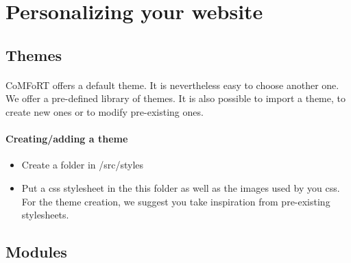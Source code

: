\documentclass{article}
\begin{document}
\section{Personalizing your website}
\subsection{Themes}

    \paragraph{}
    CoMFoRT offers a default theme. It is nevertheless easy to choose another one. We offer a pre-defined library of themes. It is also possible to import a theme, to create new ones or to modify pre-existing ones.
\paragraph{Creating/adding a theme}
      \begin{itemize}
      \item Create a folder in /src/styles
\item Put a css stylesheet in the this folder as well as the images used by you css. For the theme creation, we suggest you take inspiration from pre-existing stylesheets.
   \end{itemize}

  \subsection{Modules}
    \label{Modules}
\end{document}
